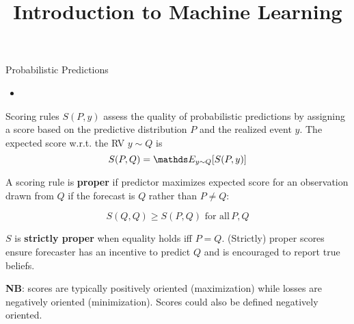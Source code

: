 \documentclass[11pt,compress,t,notes=noshow, xcolor=table]{beamer}
\title{Introduction to Machine Learning}
\begin{document}
    

\begin{vbframe}{Probabilistic Predictions }

\begin{itemize}
    \item 
\end{itemize}

Scoring rules $S(P,y)$ assess the quality of probabilistic predictions by assigning a score based on the predictive distribution $P$ and the realized event $y$. The expected score w.r.t. the RV $y \sim Q$ is
$$ S(P,Q) = \E_{y \sim Q}[S(P,y)]$$



A scoring rule is \textbf{proper} if predictor maximizes expected score for an observation drawn from $Q$ if the forecast is $Q$ rather than $P \neq Q$:

$$S(Q,Q) \geq S(P,Q) \,\, \text{for all} \, P,Q $$

\vspace{0.2cm}

$S$ is \textbf{strictly proper} when equality holds iff $P=Q$. (Strictly) proper scores ensure forecaster has an incentive to predict $Q$ and is encouraged to report true beliefs.

\vspace{0.2cm}

{\footnotesize \textbf{NB}: scores are typically positively oriented (maximization) while losses are negatively oriented (minimization). Scores could also be defined negatively oriented.}

\end{vbframe}
\end{document}
